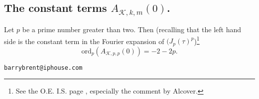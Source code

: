 \documentclass{article}
\begin{document}
\subsection[]{The constant terms $A_{\mathcal{K},k,m}(0)$.
} 
\begin{conjecture}
 Let $p$ be a prime number greater than two.
Then (recalling that the left hand side is
the constant term in the Fourier expansion
of $(J_p(\tau)^p$)\footnote{See the O.E.
I.S. page \cite{OEISlebrun}, especially 
the comment by Alcover.}
$$\text{ord}_p(A_{\mathcal{K},p,p}(0)) = -2 - 2p.$$
\end{conjecture}
\printbibliography
\tt{barrybrent@iphouse.com}
\end{document}
